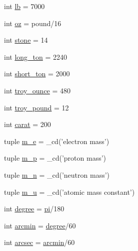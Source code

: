 \begin{DoxyCompactItemize}
\item 
int \hyperlink{namespacescipy_1_1constants_1_1constants_a3e7aa93bb2db48df2343974cb1172b3d}{lb} = 7000
\item 
int \hyperlink{namespacescipy_1_1constants_1_1constants_a9ae2051c10e3e9314b924b15b4a12c63}{oz} = pound/16
\item 
int \hyperlink{namespacescipy_1_1constants_1_1constants_ad444e23e8b06babd1a4a6611410c82f1}{stone} = 14
\item 
int \hyperlink{namespacescipy_1_1constants_1_1constants_a4192cebde5617d9d401641c279a5ce91}{long\+\_\+ton} = 2240
\item 
int \hyperlink{namespacescipy_1_1constants_1_1constants_a2efeab6ca8b5b431d9e455ce555acf5c}{short\+\_\+ton} = 2000
\item 
int \hyperlink{namespacescipy_1_1constants_1_1constants_a729056a78226422d9ae1c64c36298521}{troy\+\_\+ounce} = 480
\item 
int \hyperlink{namespacescipy_1_1constants_1_1constants_a139b018d11f1b8fab8503023ec8f6b0a}{troy\+\_\+pound} = 12
\item 
int \hyperlink{namespacescipy_1_1constants_1_1constants_a1bab47dbcef47900c2a55f552a0fd903}{carat} = 200
\item 
tuple \hyperlink{namespacescipy_1_1constants_1_1constants_a86028c5d0293a902fefcbf21363a1d8d}{m\+\_\+e} = \+\_\+cd('electron mass')
\item 
tuple \hyperlink{namespacescipy_1_1constants_1_1constants_abee1b9e001274682f664d4f18c2f517b}{m\+\_\+p} = \+\_\+cd('proton mass')
\item 
tuple \hyperlink{namespacescipy_1_1constants_1_1constants_accf629e5d9df760f202d455a7dd7e0c3}{m\+\_\+n} = \+\_\+cd('neutron mass')
\item 
tuple \hyperlink{namespacescipy_1_1constants_1_1constants_a38090cf0ee7ce38c7dcd16b5225cbfa1}{m\+\_\+u} = \+\_\+cd('atomic mass constant')
\item 
int \hyperlink{namespacescipy_1_1constants_1_1constants_a0ba0b9cbf61d72f84e227632d4410b4b}{degree} = \hyperlink{namespacescipy_1_1constants_1_1constants_a0dbffed0c49b0883ca0dba1aca0aca40}{pi}/180
\item 
int \hyperlink{namespacescipy_1_1constants_1_1constants_aac05e54288adecd9d515e8bb2d589b4f}{arcmin} = \hyperlink{namespacescipy_1_1constants_1_1constants_a0ba0b9cbf61d72f84e227632d4410b4b}{degree}/60
\item 
int \hyperlink{namespacescipy_1_1constants_1_1constants_a27c813b21514959ad5ece9aa0f0ddf72}{arcsec} = \hyperlink{namespacescipy_1_1constants_1_1constants_aac05e54288adecd9d515e8bb2d589b4f}{arcmin}/60

\end{DoxyCompactItemize}
